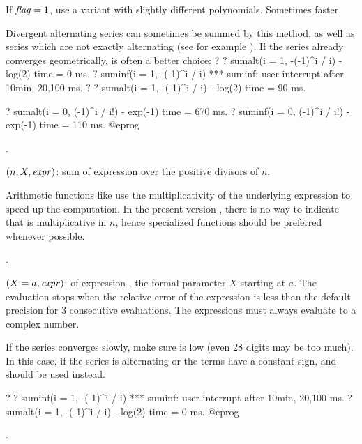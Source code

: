 If $\hbox{\it f\kern0pt lag\/}=1$, use a variant with slightly different polynomials. Sometimes
faster.

Divergent alternating series can sometimes be summed by this method, as well
as series which are not exactly alternating (see for example
). If the series already converges geometrically,
 is often a better choice:
\bprog
? 
? sumalt(i = 1, -(-1)^i / i)  - log(2)
time = 0 ms.
? suminf(i = 1, -(-1)^i / i)
  *** suminf: user interrupt after 10min, 20,100 ms.
? 
? sumalt(i = 1, -(-1)^i / i)  - log(2)
time = 90 ms.

? sumalt(i = 0, (-1)^i / i!) - exp(-1)
time = 670 ms.
? suminf(i = 0, (-1)^i / i!) - exp(-1)
time = 110 ms.
@eprog

.

$(n,X,\hbox{\it expr\/})$: sum of expression  over
the positive divisors of $n$.

Arithmetic functions like  use the multiplicativity of the
underlying expression to speed up the computation. In the present version
\vers, there is no way to indicate that  is multiplicative in
$n$, hence specialized functions should be preferred whenever possible.

.

$(X=a,\hbox{\it expr\/})$:  of expression
, the formal parameter $X$ starting at $a$. The evaluation stops
when the relative error of the expression is less than the default precision
for 3 consecutive evaluations. The expressions must always evaluate to a
complex number.

If the series converges slowly, make sure  is low (even 28
digits may be too much). In this case, if the series is alternating or the
terms have a constant sign,  and  should be used
instead.

\bprog
? 
? suminf(i = 1, -(-1)^i / i)
  *** suminf: user interrupt after 10min, 20,100 ms.
? sumalt(i = 1, -(-1)^i / i)  - log(2)
time = 0 ms.
@eprog

.

